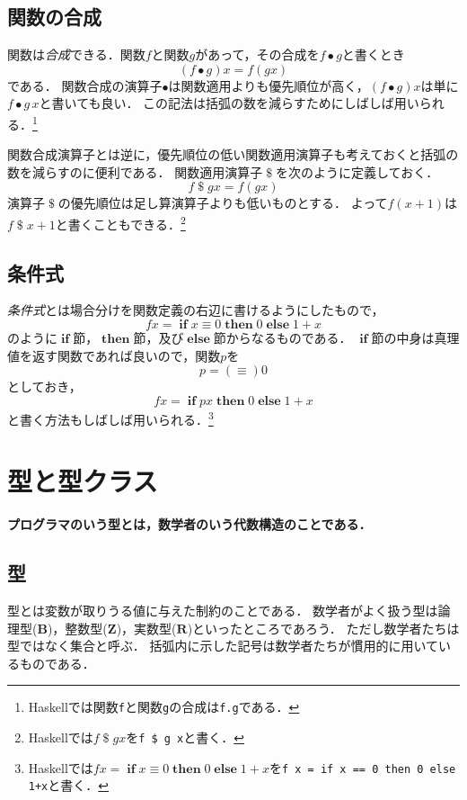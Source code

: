 \documentclass[twocolumn]{jsbook}
\newcommand{\keyword}[1]{\emph{#1}}
\newcommand{\code}[1]{\texttt{#1}}
\newenvironment{leader}{\begingroup\bf}{\endgroup}
\newcommand{\binaryeq}{\equiv}
\newcommand{\binarycompose}{\bullet}
\newcommand{\binaryapply}{\mathop{\$}}
\newcommand{\keywordname}[1]{\mathbf{#1}}
\newcommand{\keywordif}{\mathop{\keywordname{if}}}
\newcommand{\keywordthen}{\mathop{\keywordname{then}}}
\newcommand{\keywordelse}{\mathop{\keywordname{else}}}
\newcommand{\mathsetname}[1]{\boldsymbol{#1}}
\begin{document}
\section{関数の合成}

関数は\keyword{合成}できる．関数$f$と関数$g$があって，その合成を$f\binarycompose g$と書くとき$$(f\binarycompose g)x=f(gx)$$である．
関数合成の演算子$\binarycompose$は関数適用よりも優先順位が高く，$(f\binarycompose g)x$は単に$f\binarycompose g\,x$と書いても良い．
この記法は括弧の数を減らすためにしばしば用いられる．\footnote{Haskellでは関数\code{f}と関数\code{g}の合成は\code{f.g}である．}

関数合成演算子とは逆に，優先順位の低い関数適用演算子も考えておくと括弧の数を減らすのに便利である．
関数適用演算子$\binaryapply$を次のように定義しておく．
$$f\binaryapply gx=f(gx)$$
演算子$\binaryapply$の優先順位は足し算演算子よりも低いものとする．
よって$f(x+1)$は$f\binaryapply x+1$と書くこともできる．\footnote{Haskellでは$f\binaryapply gx$を\code{f \$ g x}と書く．}

\section{条件式}

\keyword{条件式}とは場合分けを関数定義の右辺に書けるようにしたもので，
$$fx=\keywordif x\binaryeq0\keywordthen0\keywordelse1+x$$
のように$\keywordif$節，$\keywordthen$節，及び$\keywordelse$節からなるものである．
$\keywordif$節の中身は真理値を返す関数であれば良いので，関数$p$を$$p=(\equiv)0$$としておき，$$fx=\keywordif px\keywordthen0\keywordelse 1+x$$と書く方法もしばしば用いられる．\footnote{Haskellでは$fx=\keywordif x\binaryeq0\keywordthen0\keywordelse1+x$を\code{f x = if x == 0 then 0 else 1+x}と書く．}

\chapter{型と型クラス}

\begin{leader}
プログラマのいう型とは，数学者のいう代数構造のことである．
\end{leader}


\section{型}

型とは変数が取りうる値に与えた制約のことである．
数学者がよく扱う型は論理型($\mathsetname{B}$)，整数型($\mathsetname{Z}$)，実数型($\mathsetname{R}$)といったところであろう．
ただし数学者たちは型ではなく集合と呼ぶ．
括弧内に示した記号は数学者たちが慣用的に用いているものである．
\end{document}
